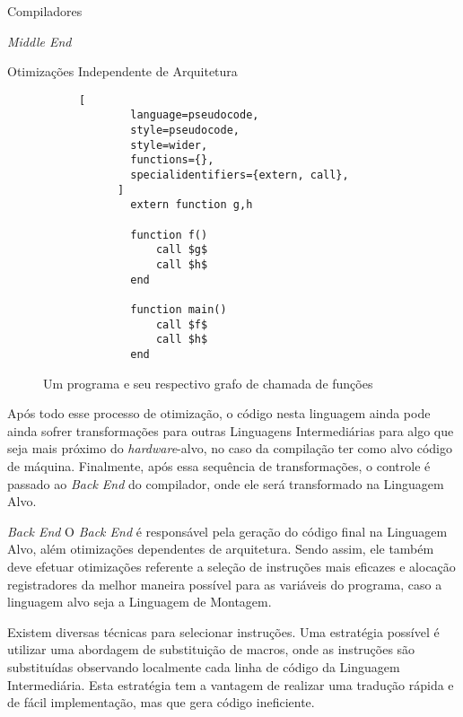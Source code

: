 \begin{section}{Compiladores}
\begin{subsection}{\textit{Middle End}}
\begin{subsubsection}{Otimizações Independente de Arquitetura}
\begin{figure}[ht]
\begin{subfigure}[b]{0.40\textwidth}
\begin{center}
{
    }
    \end{center}
    \label{fig:call_graph}
  \end{subfigure}
  \begin{subfigure}[b]{0.40\textwidth}
      \begin{lstlisting}[
        language=pseudocode,
        style=pseudocode,
        style=wider,
        functions={},
        specialidentifiers={extern, call},
      ]
        extern function g,h

        function f()
            call $g$
            call $h$
        end

        function main()
            call $f$
            call $h$
        end
      \end{lstlisting}
  \end{subfigure}
  \caption{Um programa e seu respectivo grafo de chamada de funções}
  \label{fig:call_graph}
\end{figure}


    Após todo esse processo de otimização, o código nesta linguagem ainda
pode ainda sofrer transformações para outras Linguagens
Intermediárias para algo que seja mais próximo do
\textit{hardware}-alvo, no caso da compilação ter como alvo código de máquina.
Finalmente, após essa sequência de transformações, o controle é
passado ao \textit{Back End} do compilador, onde ele será transformado na
Linguagem Alvo.

\end{subsubsection}

\end{subsection}

\begin{subsection}{\textit{Back End}}
    O \textit{Back End} é responsável pela geração do código final na
Linguagem Alvo, além otimizações dependentes
de arquitetura. Sendo assim, ele também deve efetuar otimizações referente
a  seleção de instruções mais eficazes e alocação registradores
da melhor maneira possível para as variáveis do programa, caso a linguagem alvo
seja a Linguagem de Montagem.

    Existem diversas técnicas para selecionar instruções. Uma estratégia possível
é  utilizar uma abordagem de substituição de macros, onde as instruções são substituídas
observando localmente cada linha de código da Linguagem Intermediária. Esta estratégia
tem a vantagem de realizar uma tradução rápida e de fácil implementação, mas que gera
código ineficiente. 


\end{subsection}
\end{section}
